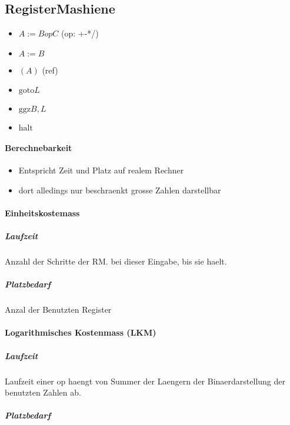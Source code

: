 \subsection{RegisterMashiene}
	\begin{itemize}
	\item $A := B op C$ (op: +-*/)
	\item $A := B$
	\item $(A)$ (ref)
	\item $\text{goto} L$
	\item $\text{ggz}  B,L$
	\item $\text{halt}$
	\end{itemize}
\paragraph{Berechnebarkeit}
\begin{itemize}
\item Entspricht Zeit und Platz auf realem Rechner
\item dort alledings nur beschraenkt grosse Zahlen darstellbar
\end{itemize}

\paragraph{Einheitskostemass}
\subparagraph{Laufzeit}
Anzahl der Schritte der RM. bei dieser
Eingabe, bis sie haelt.

\subparagraph{Platzbedarf}
Anzal der Benutzten Register

\paragraph{Logarithmisches Kostenmass (LKM)}
\subparagraph{Laufzeit}
Laufzeit einer op haengt von Summer der Laengern der
Binaerdarstellung der benutzten Zahlen ab.

\subparagraph{Platzbedarf}


